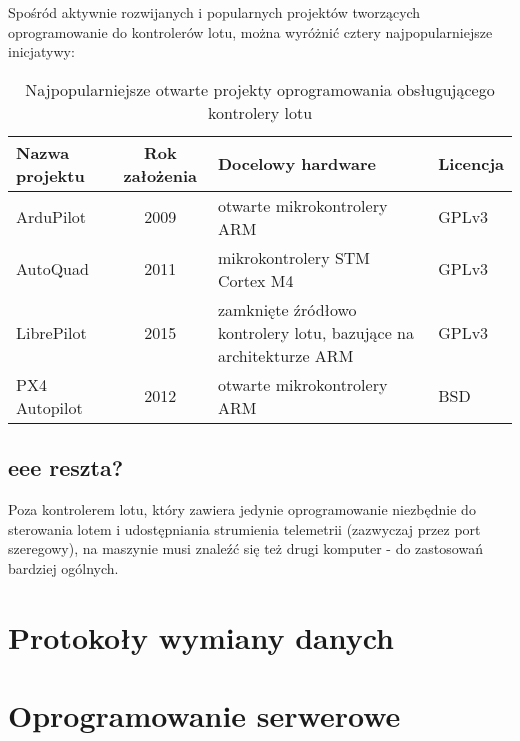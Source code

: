Spośród aktywnie rozwijanych i popularnych
projektów \cite{autopilots_sourvey} tworzących oprogramowanie do kontrolerów
lotu, można wyróżnić cztery najpopularniejsze inicjatywy: \\

\begin{table}[htb]
	\centering\small
	\caption{
		Najpopularniejsze otwarte projekty
		oprogramowania obsługującego kontrolery lotu
	}
	\label{tab}

	\begin{tabularx}{0.87\textwidth}
	{ 
	| >{\raggedright\arraybackslash}l 
	| c 
	| >{\raggedright\arraybackslash}X
	| >{\raggedleft\arraybackslash}l |
	}
	\hline
	\textbf{Nazwa projektu} & \textbf{Rok założenia} &
	\textbf{Docelowy hardware}
	&  \textbf{Licencja}
	\\\hline
	ArduPilot\cite{ardupilot_home_page}		&  2009	& otwarte mikrokontrolery ARM & GPLv3
	\\ \hline
	AutoQuad\cite{autoquad_timeline}		&  2011	& mikrokontrolery STM Cortex M4		 & GPLv3
	\\ \hline
	LibrePilot\cite{librepilot_home_page}	&  2015	& zamknięte źródłowo kontrolery lotu, bazujące na architekturze ARM & GPLv3
	\\ \hline       
	PX4 Autopilot\cite{px4_home_page}		&  2012	& otwarte mikrokontrolery ARM & BSD
	\\ \hline       
	\end{tabularx}
	
\end{table}


\subsection{eee reszta?}

Poza kontrolerem lotu, który zawiera jedynie oprogramowanie 
niezbędnie do sterowania lotem i udostępniania
strumienia telemetrii (zazwyczaj przez port szeregowy),
na maszynie musi znaleźć się też drugi komputer - 
do zastosowań bardziej ogólnych.

\section{Protokoły wymiany danych}

\section{Oprogramowanie serwerowe}

